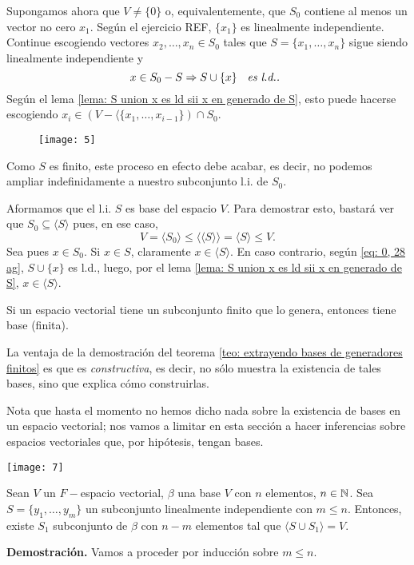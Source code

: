 Supongamos ahora que $V \neq \{ 0 \}$ o, equivalentemente, que
$S_{0}$ contiene al menos un vector no cero $x_{1}$. Según el ejercicio
REF, $\{ x_{1} \}$ es linealmente independiente. Continue
escogiendo vectores $x_{2}, \ldots , x_{n} \in S_{0}$
tales que $S = \{ x_{1}, \ldots , x_{n} \}$ sigue siendo 
linealmente independiente y 
\begin{equation}
	\label{eq: 0, 28 ag}
	x \in S_{0} - S \Rightarrow S \cup \{ x \}
	\hspace{0.2cm} \textit{ es l.d.. }
\end{equation}
Según el lema 
\ref{lema: S union x es ld sii x en generado de S}, 
esto puede hacerse escogiendo
$x_{i} \in (V - \langle \{ x_{1}, \ldots , x_{i-1} \}) \cap S_{0}$.
\begin{figure}[H]
	\centering
	\texttt{[image: 5]} 
\end{figure}	
Como $S$ es finito, este proceso en efecto debe acabar,
es decir, no podemos ampliar indefinidamente a nuestro subconjunto
l.i. de $S_{0}$.

Aformamos que el l.i. $S$ es base del espacio $V$. Para demostrar esto,
bastará ver que $S_{0} \subseteq \langle S \rangle$
pues, en ese caso,
\[
V = \langle S_{0} \rangle \leq \langle \langle S \rangle \rangle
= \langle S \rangle \leq V. 
\]
Sea pues $x \in S_{0}$. Si $x \in S$, claramente 
$x \in \langle S \rangle$. En caso contrario, según 
\ref{eq: 0, 28 ag}, $S \cup \{ x \}$ es l.d., luego,
por el lema \ref{lema: S union x es ld sii x en generado de S},
$x \in \langle S \rangle$.
\QEDB
\vspace{0.2cm}

\begin{cor}
Si un espacio vectorial tiene un subconjunto finito que lo genera,
entonces tiene base (finita).
\end{cor}

La ventaja de la demostración del teorema
\ref{teo: extrayendo bases de generadores finitos}
es que es \textit{constructiva}, es decir, no sólo
muestra la existencia de tales bases, sino que explica
cómo construirlas.

Nota que hasta el momento no hemos dicho nada sobre la existencia
de bases en un espacio vectorial; nos vamos a limitar en esta
sección a hacer inferencias sobre espacios vectoriales que,
por hipótesis, tengan bases. 

\begin{teo}
	\label{teo: un li se completa a generador mediante una base}
\begin{marginfigure}
\texttt{[image: 7]} 
\end{marginfigure}
Sean $V$ un $F-$espacio vectorial, $\beta$ una base $V$ con $n$
elementos, $n \in \mathbb{N}$. Sea
$S = \{ y_{1}, \ldots , y_{m} \}$ un subconjunto linealmente independiente
con $m \leq n$. Entonces, existe $S_{1}$ subconjunto de $\beta$
con $n-m$ elementos tal que $\langle S \cup S_{1} \rangle = V$.
\end{teo}
\noindent
\textbf{Demostración.}
Vamos a proceder por inducción sobre $m \leq n$.

